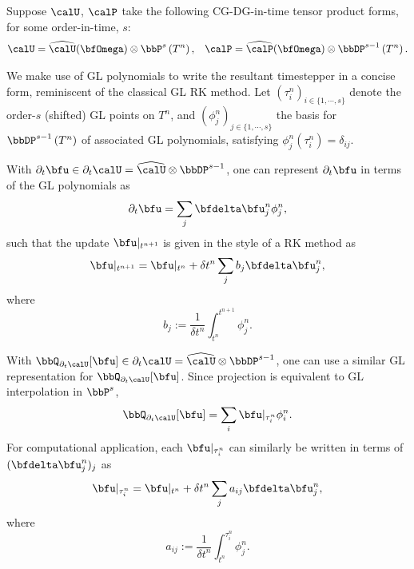     \begin{example}
        Suppose $\calU$, $\calP$ take the following CG-DG-in-time tensor product forms, for some order-in-time, $s$:
        \begin{align}
            \calU  =  \widehat{\calU}(\bfOmega)\otimes\bbP^{s}\left(T^{n}\right),  &&
            \calP  =  \widehat{\calP}(\bfOmega)\otimes\bbDP^{s - 1}\left(T^{n}\right).
        \end{align}

        We make use of GL polynomials to write the resultant timestepper in a concise form, reminiscent of the classical GL RK method. Let $\left(\tau^{n}_{i}\right)_{i \in \{1, \cdots, s\}}$ denote the order-$s$ (shifted) GL points on $T^{n}$, and $\left(\phi^{n}_{j}\right)_{j \in \{1, \cdots, s\}}$ the basis for $\bbDP^{s - 1}\left(T^{n}\right)$ of associated GL polynomials, satisfying $\phi^{n}_{j}(\tau^{n}_{i}) = \delta_{ij}$.

        With $\partial_{t}\bfu \in \partial_{t}\calU = \widehat{\calU}\otimes\bbDP^{s - 1}$, one can represent $\partial_{t}\bfu$ in terms of the GL polynomials as
        \begin{equation}
            \partial_{t}\bfu  =  \sum_{j}\bfdelta\bfu^{n}_{j}\phi^{n}_{j},
        \end{equation}
        such that the update $\bfu|_{t^{n + 1}}$ is given in the style of a RK method as
        \begin{equation}
            \bfu|_{t^{n + 1}}  =  \bfu|_{t^{n}} + \delta t^{n}\sum_{j}b_{j}\bfdelta\bfu^{n}_{j},
        \end{equation}
        where
        \begin{equation}\label{eqn:b_j definition}
            b_{j}  :=  \frac{1}{\delta t^{n}}\int_{t^{n}}^{t^{n + 1}}\phi^{n}_{j}.
        \end{equation}

        With $\bbQ_{\partial_{t}\calU}[\bfu] \in \partial_{t}\calU = \widehat{\calU}\otimes\bbDP^{s - 1}$, one can use a similar GL representation for $\bbQ_{\partial_{t}\calU}[\bfu]$. Since projection is equivalent to GL interpolation in $\bbP^{s}$,
        \begin{equation}
            \bbQ_{\partial_{t}\calU}[\bfu]  =  \sum_{i}\bfu|_{\tau^{n}_{i}}\phi^{n}_{i}.
        \end{equation}
        For computational application, each $\bfu|_{\tau^{n}_{i}}$ can similarly be written in terms of $(\bfdelta\bfu^{n}_{j})_{j}$ as
        \begin{equation}
            \bfu|_{\tau^{n}_{i}}  =  \bfu|_{t^{n}} + \delta t^{n}\sum_{j}a_{ij}\bfdelta\bfu^{n}_{j},
        \end{equation}
        where
        \begin{equation}\label{eqn:a_ij definition}
            a_{ij}  :=  \frac{1}{\delta t^{n}}\int_{t^{n}}^{\tau^{n}_{i}}\phi^{n}_{j}.
        \end{equation}
        

\end{example}
